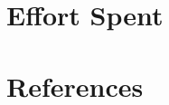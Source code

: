 \documentclass[11pt,twoside]{article}
\begin{document}
\clearpage
\section{Effort Spent}\label{sect:effort}



\clearpage
\section{References}\label{sect:references}


\end{document}
